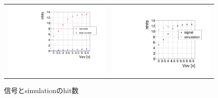 \documentclass[uplatex, titlepage, dvipdfmx, 12pt, a4paper]{jsreport}
\begin{document}
    \begin{figure}[hbtp]
      \begin{tabular}{cc}
        \begin{minipage}[t]{0.45\hsize}
          \centering
          \includegraphics[scale=0.36, clip]{image/hit_count.pdf}
          \caption{信号と暗電流のhit数} 
          \label{fig:hit_dark} 
        \end{minipage} &
        \begin{minipage}[t]{0.45\hsize}
          \centering
          \includegraphics[scale=0.35, clip]{image/hit_simulation.pdf}
          \caption{信号とsimulationのhit数} 
          \label{fig:hit_simulation} 
        \end{minipage}
      \end{tabular}
    \end{figure}
    
\end{document}

